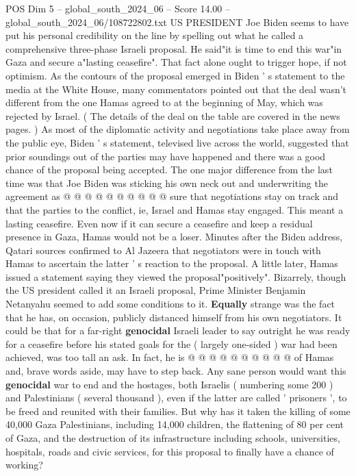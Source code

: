 \begin{textsample}{POS Dim 5 – global\_south\_2024\_06 – Score 14.00 – global\_south\_2024\_06/108722802.txt}  \label{ex:f5_pos_228}
US PRESIDENT Joe Biden seems to have put his personal credibility on the line by spelling out what he called a comprehensive three-phase Israeli proposal.
He said"it is time to end this war"in Gaza and secure a"lasting ceasefire".
That fact alone ought to trigger hope, if not optimism.
As the contours of the proposal emerged in Biden ' s statement to the media at the White House, many commentators pointed out that the deal wasn't different from the one Hamas agreed to at the beginning of May, which was rejected by Israel. ( The details of the deal on the table are covered in the news pages. ) As most of the diplomatic activity and negotiations take place away from the public eye, Biden ' s statement, televised live across the world, suggested that prior soundings out of the parties may have happened and there was a good chance of the proposal being accepted.
The one major difference from the last time was that Joe Biden was sticking his own neck out and underwriting the agreement as @ @ @ @ @ @ @ @ @ @ sure that negotiations stay on track and that the parties to the conflict, ie, Israel and Hamas stay engaged.
This meant a lasting ceasefire.
Even now if it can secure a ceasefire and keep a residual presence in Gaza, Hamas would not be a loser.
Minutes after the Biden address, Qatari sources confirmed to Al Jazeera that negotiators were in touch with Hamas to ascertain the latter ' s reaction to the proposal.
A little later, Hamas issued a statement saying they viewed the proposal"positively".
Bizarrely, though the US president called it an Israeli proposal, Prime Minister Benjamin Netanyahu seemed to add some conditions to it. \textbf{Equally} strange was the fact that he has, on occasion, publicly distanced himself from his own negotiators.
It could be that for a far-right \textbf{genocidal} Israeli leader to say outright he was ready for a ceasefire before his stated goals for the ( largely one-sided ) war had been achieved, was too tall an ask.
In fact, he is @ @ @ @ @ @ @ @ @ @ of Hamas and, brave words aside, may have to step back.
Any sane person would want this \textbf{genocidal} war to end and the hostages, both Israelis ( numbering some 200 ) and Palestinians ( several thousand ), even if the latter are called ' prisoners ', to be freed and reunited with their families.
But why has it taken the killing of some 40,000 Gaza Palestinians, including 14,000 children, the flattening of 80 per cent of Gaza, and the destruction of its infrastructure including schools, universities, hospitals, roads and civic services, for this proposal to finally have a chance of working?

\end{textsample}
